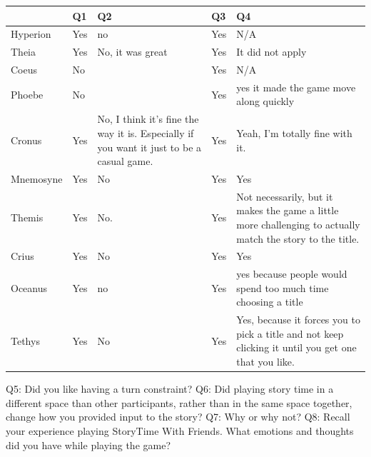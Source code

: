 \documentclass{sigchi}
\begin{document}
\FloatBarrier
\begin{table}[ht]
\begin{tabularx}{\linewidth}{>{\raggedright}X | >{\raggedright}X | >{\raggedright}X | >{\raggedright}X | >{\raggedright}X }
 & Q1 & Q2 & Q3 & Q4 \tabularnewline \hline
Hyperion & Yes & no & Yes & N/A \tabularnewline \hline
Theia & Yes & No, it was great & Yes & It did not apply \tabularnewline \hline
Coeus & No &  & Yes & N/A \tabularnewline \hline
Phoebe & No &  & Yes & yes it made the game move along quickly \tabularnewline \hline
Cronus & Yes & No, I think it's fine the way it is. Especially if you want it just to be a casual game. & Yes & Yeah, I'm totally fine with it. \tabularnewline \hline
Mnemosyne & Yes & No & Yes & Yes \tabularnewline \hline
Themis & Yes & No. & Yes & Not necessarily, but it makes the game a little more challenging to actually match the story to the title. \tabularnewline \hline
Crius & Yes & No & Yes & Yes \tabularnewline \hline
Oceanus & Yes & no & Yes & yes because people would spend too much time choosing a title \tabularnewline \hline
Tethys & Yes & No & Yes & Yes, because it forces you to pick a title and not keep clicking it until you get one that you like. \tabularnewline \hline
\end{tabularx}
\end{table}

\FloatBarrier
\newpage
Q5: Did you like having a turn constraint?\newline
Q6: Did playing story time in a different space than other participants, rather than in the same space together, change how you provided input to the story?\newline
Q7: Why or why not?\newline
Q8: Recall your experience playing StoryTime With Friends. What emotions and thoughts did you have while playing the game?\newline
\end{document}
